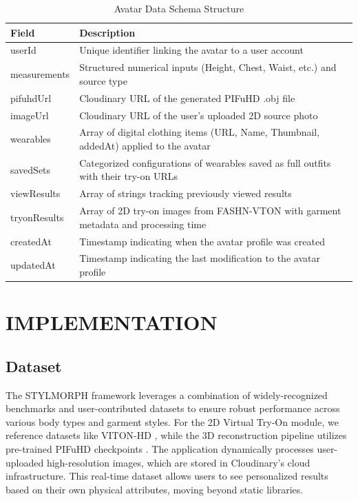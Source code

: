 \documentclass[12pt,a4paper,oneside]{report}
\begin{document}
\begin{table}[H]
\centering
\caption{Avatar Data Schema Structure}
\label{tab:avatar-schema}
\begin{tabular}{|l|p{8cm}|}
\hline
\textbf{Field} & \textbf{Description} \\
\hline
userId & Unique identifier linking the avatar to a user account \\
measurements & Structured numerical inputs (Height, Chest, Waist, etc.) and source type \cite{8} \\
pifuhdUrl & Cloudinary URL of the generated PIFuHD \cite{1} .obj file \\
imageUrl & Cloudinary URL of the user's uploaded 2D source photo \\
wearables & Array of digital clothing items (URL, Name, Thumbnail, addedAt) applied to the avatar \\
savedSets & Categorized configurations of wearables saved as full outfits with their try-on URLs \\
viewResults & Array of strings tracking previously viewed results \\
tryonResults & Array of 2D try-on images from FASHN-VTON \cite{16} with garment metadata and processing time \\
createdAt & Timestamp indicating when the avatar profile was created \\
updatedAt & Timestamp indicating the last modification to the avatar profile \\
\hline
\end{tabular}
\end{table}



\chapter{IMPLEMENTATION}

\section{Dataset}
The STYLMORPH framework leverages a combination of widely-recognized benchmarks and user-contributed datasets to ensure robust performance across various body types and garment styles. For the 2D Virtual Try-On module, we reference datasets like VITON-HD \cite{17}, while the 3D reconstruction pipeline utilizes pre-trained PIFuHD checkpoints \cite{1}. The application dynamically processes user-uploaded high-resolution images, which are stored in Cloudinary's cloud infrastructure. This real-time dataset allows users to see personalized results based on their own physical attributes, moving beyond static libraries.
\end{document}
